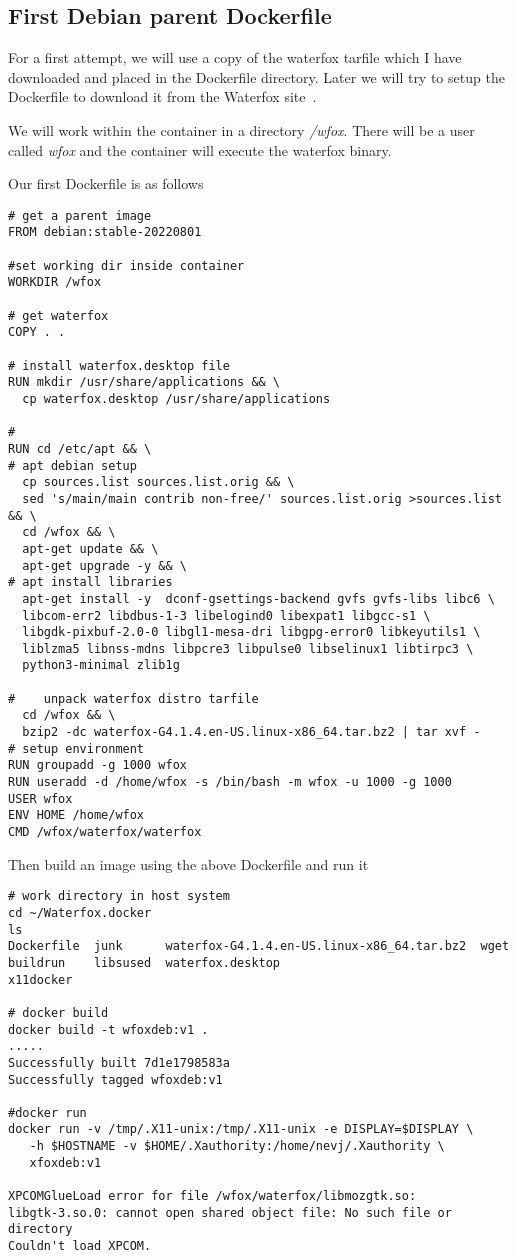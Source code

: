 \documentclass[a4paper]{article}  %
\begin{document}
\subsection{First Debian parent Dockerfile}
For a first attempt, we will use a copy of the waterfox tarfile which I have downloaded and placed in the Dockerfile directory. Later we will try to setup the Dockerfile to download it from the Waterfox site~\cite{wate:22b}.

We will work within the container in a directory {\em /wfox}. There will be a user called {\em wfox} and the container will execute the waterfox binary.

Our first Dockerfile is as follows
\begin{tcolorbox}
\begin{verbatim}
# get a parent image
FROM debian:stable-20220801

#set working dir inside container
WORKDIR /wfox

# get waterfox
COPY . .

# install waterfox.desktop file
RUN mkdir /usr/share/applications && \
  cp waterfox.desktop /usr/share/applications

#  
RUN cd /etc/apt && \
# apt debian setup
  cp sources.list sources.list.orig && \
  sed 's/main/main contrib non-free/' sources.list.orig >sources.list && \
  cd /wfox && \
  apt-get update && \
  apt-get upgrade -y && \
# apt install libraries
  apt-get install -y  dconf-gsettings-backend gvfs gvfs-libs libc6 \
  libcom-err2 libdbus-1-3 libelogind0 libexpat1 libgcc-s1 \
  libgdk-pixbuf-2.0-0 libgl1-mesa-dri libgpg-error0 libkeyutils1 \
  liblzma5 libnss-mdns libpcre3 libpulse0 libselinux1 libtirpc3 \
  python3-minimal zlib1g

#    unpack waterfox distro tarfile
  cd /wfox && \
  bzip2 -dc waterfox-G4.1.4.en-US.linux-x86_64.tar.bz2 | tar xvf - 
# setup environment
RUN groupadd -g 1000 wfox
RUN useradd -d /home/wfox -s /bin/bash -m wfox -u 1000 -g 1000
USER wfox
ENV HOME /home/wfox
CMD /wfox/waterfox/waterfox
\end{verbatim}
\end{tcolorbox}
 Then build an image using the above Dockerfile and run it
\begin{tcolorbox}
\begin{verbatim}
# work directory in host system
cd ~/Waterfox.docker
ls
Dockerfile  junk      waterfox-G4.1.4.en-US.linux-x86_64.tar.bz2  wget
buildrun    libsused  waterfox.desktop                            x11docker

# docker build
docker build -t wfoxdeb:v1 .
.....
Successfully built 7d1e1798583a
Successfully tagged wfoxdeb:v1

#docker run
docker run -v /tmp/.X11-unix:/tmp/.X11-unix -e DISPLAY=$DISPLAY \
   -h $HOSTNAME -v $HOME/.Xauthority:/home/nevj/.Xauthority \
   xfoxdeb:v1

XPCOMGlueLoad error for file /wfox/waterfox/libmozgtk.so:
libgtk-3.so.0: cannot open shared object file: No such file or directory
Couldn't load XPCOM.
\end{verbatim}
\end{tcolorbox}
\end{document}
